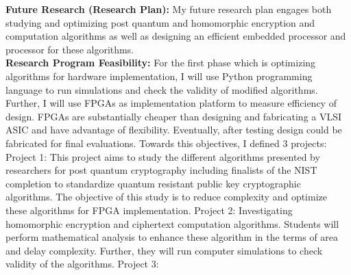 \documentclass[12pt,oneside]{book}
\begin{document}
{\bf Future Research (Research Plan): }
My future research plan engages both studying and optimizing post quantum and homomorphic  encryption  and computation algorithms as well as designing an efficient embedded processor and processor for these algorithms. 
%
%
%
\\{\bf Research Program Feasibility: }
For the first phase which is optimizing  algorithms for hardware implementation, I will use Python programming language to run simulations and check the validity of  modified algorithms.  Further, I will use FPGAs as implementation platform to measure efficiency of design. FPGAs are substantially cheaper than designing  and fabricating a VLSI ASIC and have advantage of flexibility. Eventually, after testing design could be fabricated for final evaluations. Towards this objectives, I defined 3 projects:
 Project 1: 
This project aims to study the different algorithms presented by researchers for 
post quantum cryptography including finalists of the NIST completion to standardize  quantum resistant public key cryptographic algorithms. The objective of this study is to reduce complexity and optimize these algorithms for FPGA implementation. 
{ Project 2:}
Investigating homomorphic encryption and ciphertext computation algorithms. Students will 
perform mathematical analysis to enhance these algorithm in the terms of area and delay complexity. Further, they will run computer simulations to check validity of the algorithms. 
{ Project 3:}
\end{document}
